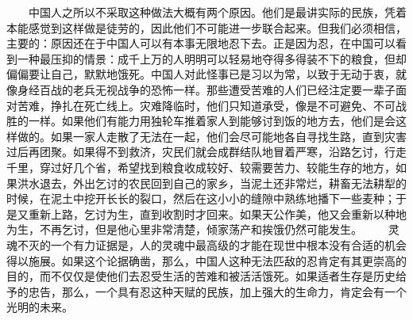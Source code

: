\documentclass[12pt,oneside]{book}
\begin{document}
\begin{common-format}
　　中国人之所以不采取这种做法大概有两个原因。他们是最讲实际的民族，凭着本能感觉到这样做是徒劳的，因此他们不可能进一步联合起来。但我们必须相信，主要的：原因还在于中国人可以有本事无限地忍下去。正是因为忍，在中国可以看到一种最压抑的情景：成千上万的人明明可以轻易地夺得多得装不下的粮食，但却偏偏要让自己，默默地饿死。中国人对此怪事已是习以为常，以致于无动于衷，就像身经百战的老兵无视战争的恐怖一样。那些遭受苦难的人们已经注定要一辈子面对苦难，挣扎在死亡线上。灾难降临时，他们只知道承受，像是不可避免、不可战胜的一样。如果他们有能力用独轮车推着家人到能够讨到饭的地方去，他们是会这样做的。如果一家人走散了无法在一起，他们会尽可能地各自寻找生路，直到灾害过后再团聚。如果得不到救济，灾民们就会成群结队地冒着严寒，沿路乞讨，行走千里，穿过好几个省，希望找到粮食收成较好、较需要苦力、较能生存的地方，如果洪水退去，外出乞讨的农民回到自己的家乡，当泥土还非常烂，耕畜无法耕犁的时候，在泥土中挖开长长的裂口，然后在这小小的缝隙中熟练地播下一些麦种；于是又重新上路，乞讨为生，直到收割时才回来。如果天公作美，他又会重新以种地为生，不再乞讨，但是他心里非常清楚，倾家荡产和挨饿仍然可能发生。 
　　灵魂不灭的一个有力证据是，人的灵魂中最高级的才能在现世中根本没有合适的机会得以施展。如果这个论据确凿，那么，中国人这种无法匹敌的忍肯定有其更崇高的目的，而不仅仅是使他们去忍受生活的苦难和被活活饿死。如果适者生存是历史给予的忠告，那么，一个具有忍这种天赋的民族，加上强大的生命力，肯定会有一个光明的未来。


\end{common-format}
\end{document}
